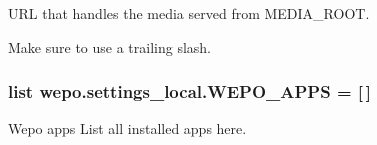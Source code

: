 U\-R\-L that handles the media served from M\-E\-D\-I\-A\-\_\-\-R\-O\-O\-T. 

Make sure to use a trailing slash. \hypertarget{namespacewepo_1_1settings__local_a2a6dd2eb093d78609eb8995efb98d166}{
\subsubsection[{W\-E\-P\-O\-\_\-\-A\-P\-P\-S}]{\setlength{\rightskip}{0pt plus 5cm}list wepo.\-settings\-\_\-local.\-W\-E\-P\-O\-\_\-\-A\-P\-P\-S = \mbox{[}$\,$\mbox{]}}}\label{namespacewepo_1_1settings__local_a2a6dd2eb093d78609eb8995efb98d166}


Wepo apps List all installed apps here. 

